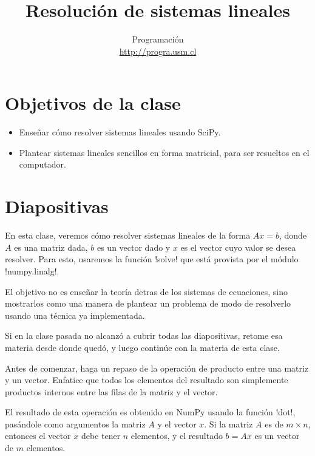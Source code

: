 \documentclass[10pt]{article}
\title{Resolución de sistemas lineales}
\author{Programación \\ \url{http://progra.usm.cl}}
\date{}
\begin{document}
  \maketitle

  \section*{Objetivos de la clase}
  \begin{itemize}
    \item Enseñar cómo resolver sistemas lineales usando SciPy.
    \item Plantear sistemas lineales sencillos
      en forma matricial, para ser resueltos en el computador.
  \end{itemize}

  \section*{Diapositivas}

  En esta clase,
  veremos cómo resolver sistemas lineales
  de la forma \(Ax = b\),
  donde \(A\) es una matriz dada,
  \(b\) es un vector dado
  y \(x\) es el vector cuyo valor se desea resolver.
  Para esto, usaremos la función \li!solve!
  que está provista por el módulo \li!numpy.linalg!.

  El objetivo no es enseñar la teoría detras de los sistemas de ecuaciones,
  sino mostrarlos como una manera de plantear un problema
  de modo de resolverlo usando una técnica ya implementada.

  Si en la clase pasada no alcanzó a cubrir todas las diapositivas,
  retome esa materia desde donde quedó,
  y luego continúe con la materia de esta clase.


  Antes de comenzar, haga un repaso de la operación
  de producto entre una matriz y un vector.
  Enfatice que todos los elementos del resultado
  son simplemente productos internos entre las filas de la matriz
  y el vector.

  El resultado de esta operación
  es obtenido en NumPy usando la función \li!dot!,
  pasándole como argumentos la matriz \(A\) y el vector \(x\).
  Si la matriz \(A\) es de \(m\times n\),
  entonces el vector \(x\) debe tener \(n\) elementos,
  y el resultado \(b = Ax\) es un vector de \(m\) elementos.

\end{document}
